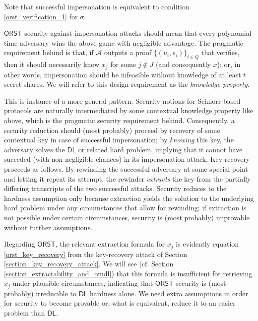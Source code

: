 \documentclass{iacrtrans}
\begin{document}
\noindent
Note that successful impersonation is equivalent
to condition \eqref{orst_verification_1} for $\sigma$.

$\mathsf{ORST}$ security against impersonation attacks should mean
that every polynomial-time adversary wins the above game
with negligible advantage.
The pragmatic requirement behind is that,
if $\mathcal{A}$ outputs a proof
$\{(u_i, s_i)\}_{i \in Q}$ that verifies,
then it should necessarily know $x_j$ for some $j \not \in J$
(and consequently $x$); or, in other words,
impersonation should be infeasible
without knowledge of at least $t$ secret shares.
We will refer to this design requirement
as the \textit{knowledge property}.

This is instance of a more general pattern.
Security notions for Schnorr-based protocols
are naturally intermediated by some
contextual knowledge property like above,
which is the pragmatic security requirement behind.
Consequently,
a security reduction should (most probably)
proceed by recovery
of some contextual key in case of successful impersonation;
by \textit{knowing} this key, the adversary solves
the $\mathsf{DL}$ or related hard problem,
implying that it cannot have succeded
(with non-negligible chances) in its impersonation attack.
Key-recovery proceeds as follows.
By rewinding the successful adversary
at some special point and letting it repeat
its attempt,
the rewinder \textit{extracts} the key
from the partially differing transcripts
of the two successful attacks.
Security reduces to the hardness assumption only because
extraction yields the solution to the underlying hard problem
under any circumstances that allow for rewinding;
if extraction is not possible under certain circumstances,
security is (most probably)
unprovable without further assumptions.

Regarding $\mathsf{ORST}$,
the relevant extraction formula for $x_j$
is evidently equation \eqref{orst_key_recovery}
from the key-recovery attack
of Section \ref{section_key_recovery_attack}.
We will see
(cf. Section \ref{section_extractability_and_omdl})
that this formula is insufficient for retrieving $x_j$
under plausible circumstances,
indicating that $\mathsf{ORST}$ security
is (most probably) irreducible
to $\mathsf{DL}$ hardness alone.
We need extra assumptions in order
for security to become provable
or, what is equivalent,
reduce it to an easier problem than $\mathsf{DL}$.
\end{document}
